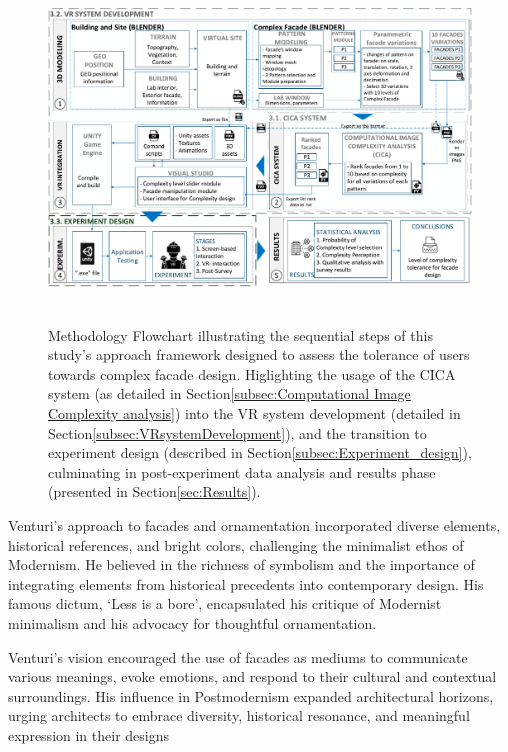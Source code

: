     \begin{figure}[!htb]
        \centering
        \includegraphics[width=\linewidth]{Images/MethodologyFlowchart}~\caption{Methodology Flowchart illustrating the sequential steps of this study's approach framework designed to assess the tolerance of users towards complex facade design. Higlighting the usage of the CICA system (as detailed in Section\ref{subsec:Computational Image Complexity analysis}) into the VR system development (detailed in Section\ref{subsec:VRsystemDevelopment}), and the transition to experiment design (described in Section\ref{subsec:Experiment_design}), culminating in post-experiment data analysis and results phase (presented in Section\ref{sec:Results}).}
          \label{fig:MethodologyFlowchart}
    \end{figure}

Venturi's approach to facades and ornamentation incorporated diverse elements, historical references, and bright colors, challenging the minimalist ethos of Modernism.
He believed in the richness of symbolism and the importance of integrating elements from historical precedents into contemporary design\cite{Venturi1971}.
His famous dictum, `Less is a bore', encapsulated his critique of Modernist minimalism and his advocacy for thoughtful ornamentation.

Venturi's vision encouraged the use of facades as mediums to communicate various meanings, evoke emotions, and respond to their cultural and contextual surroundings.
His influence in Postmodernism expanded architectural horizons, urging architects to embrace diversity, historical resonance, and meaningful expression in their designs\cite{Lutolli2020, Stamp2016}

